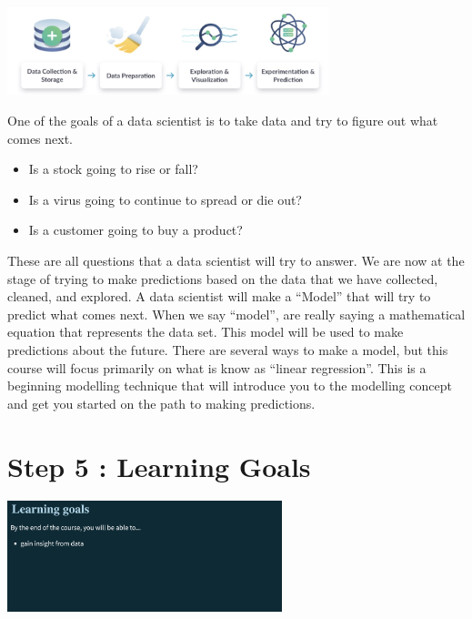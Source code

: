 \documentclass[
  letterpaper,
  DIV=11,
  numbers=noendperiod]{scrreprt}
\providecommand{\tightlist}{%
  \setlength{\itemsep}{0pt}\setlength{\parskip}{0pt}}\usepackage{longtable,booktabs,array}
\begin{document}

\includegraphics[width=0.7\textwidth,height=\textheight]{./images/WIDS-7.jpg}

One of the goals of a data scientist is to take data and try to figure
out what comes next.

\begin{itemize}
\tightlist
\item
  Is a stock going to rise or fall?
\item
  Is a virus going to continue to spread or die out?
\item
  Is a customer going to buy a product?
\end{itemize}

These are all questions that a data scientist will try to answer. We are
now at the stage of trying to make predictions based on the data that we
have collected, cleaned, and explored. A data scientist will make a
``Model'' that will try to predict what comes next. When we say
``model'', are really saying a mathematical equation that represents the
data set. This model will be used to make predictions about the future.
There are several ways to make a model, but this course will focus
primarily on what is know as ``linear regression''. This is a beginning
modelling technique that will introduce you to the modelling concept and
get you started on the path to making predictions.

\section*{Step 5 : Learning Goals}\label{step-5-learning-goals}


\includegraphics[width=0.6\textwidth,height=\textheight]{./images/WIDS-8.jpg}
\end{document}
